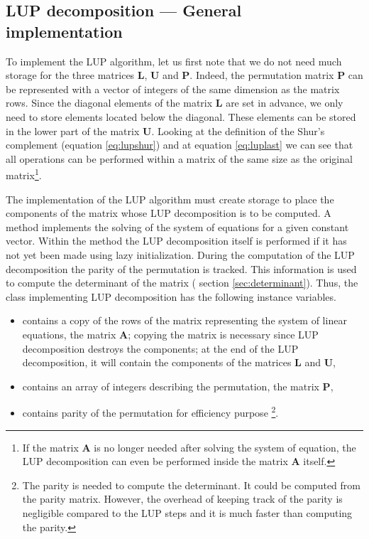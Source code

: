 \subsection{LUP decomposition --- General implementation}
To implement the LUP algorithm, let us first note that we do not need much storage for the three matrices $\textbf{L}$, $\textbf{U}$ and $\textbf{P}$.
Indeed, the permutation matrix
$\textbf{P}$ can be represented with a vector of integers of the same
dimension as the matrix rows. Since the diagonal elements of the
matrix $\textbf{L}$ are set in advance, we only need to store
elements located below the diagonal. These elements can be stored
in the lower part of the matrix $\textbf{U}$. Looking at the
definition of the Shur's complement (equation \ref{eq:lupshur})
and at equation \ref{eq:luplast} we can see that all operations
can be performed within a matrix of the same size as the original
matrix\footnote{If the matrix $\textbf{A}$ is no longer needed after
solving the system of equation, the LUP decomposition can even be
performed inside the matrix $\textbf{A}$ itself.}.

The implementation of the LUP algorithm must create storage to
place the components of the matrix whose LUP decomposition is to
be computed. A method implements the solving of the system of
equations for a given constant vector. Within the method the LUP
decomposition itself is performed if it has not yet been made
using lazy initialization. During the computation of the LUP
decomposition the parity of the permutation is tracked. This
information is used to compute the determinant of the matrix (\cf
section \ref{sec:determinant}). Thus, the class implementing LUP
decomposition has the following instance variables.
\begin{itemize}
\item {} contains a copy of the rows of the matrix
representing the system of linear equations, \ie the matrix $\textbf{A}$; copying the matrix is necessary since LUP decomposition
destroys the components; at the end of the LUP decomposition, it
will contain the components of the matrices $\textbf{L}$ and $\textbf{U}$,
\item {} contains an array of integers describing the permutation,
\ie the matrix $\textbf{P}$,
\item {} contains parity of the permutation for efficiency purpose
\footnote{The parity is needed to compute the determinant. It
could be computed from the parity matrix. However, the overhead of
keeping track of the parity is negligible compared to the LUP
steps and it is much faster than computing the parity.}.
\end{itemize}

